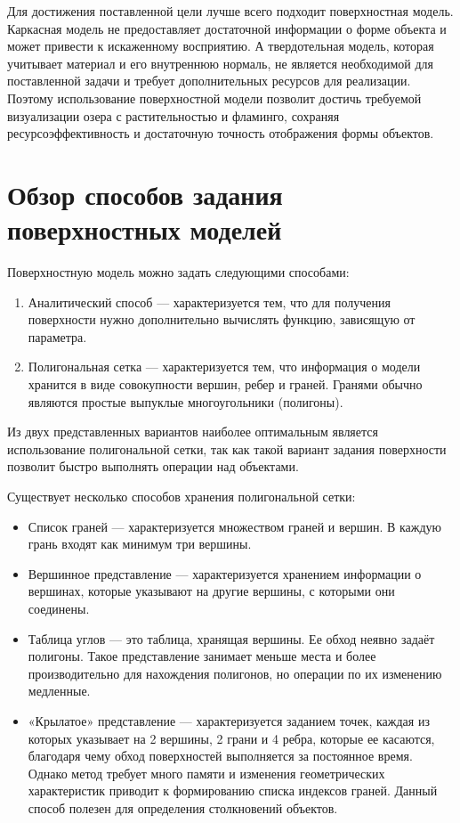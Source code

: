 Для достижения поставленной цели лучше всего подходит поверхностная модель. Каркасная модель не предоставляет достаточной информации о форме объекта и может привести к искаженному восприятию. А твердотельная модель, которая учитывает материал и его внутреннюю нормаль, не является необходимой для поставленной задачи и требует дополнительных ресурсов для реализации. Поэтому использование поверхностной модели позволит достичь требуемой визуализации озера с растительностью и фламинго, сохраняя ресурсоэффективность и достаточную точность отображения формы объектов.

\section{Обзор способов задания поверхностных моделей}

Поверхностную модель можно задать следующими способами:
\begin{enumerate}[label=\arabic*)]
	\item Аналитический способ --- характеризуется тем, что для получения поверхности нужно дополнительно вычислять функцию, зависящую от параметра.
	
	\item Полигональная сетка --- характеризуется тем, что информация о модели хранится в виде совокупности вершин, ребер и граней. Гранями обычно являются простые выпуклые многоугольники (полигоны).
\end{enumerate}

Из двух представленных вариантов наиболее оптимальным является использование полигональной сетки, так как такой вариант задания поверхности позволит быстро выполнять операции над объектами.


Существует несколько способов хранения полигональной сетки:
\begin{itemize}
	\item Список граней --- характеризуется множеством граней и вершин. В каждую грань входят как минимум три вершины. 
	\item Вершинное представление --- характеризуется хранением информации о вершинах, которые указывают на другие вершины, с которыми они соединены.
	\item Таблица углов --- это таблица, хранящая вершины. Ее обход неявно задаёт полигоны. Такое представление занимает меньше места и более производительно для нахождения полигонов, но операции по их изменению медленные.
    \item «Крылатое» представление --- характеризуется заданием точек, каждая из которых указывает на 2 вершины, 2 грани и 4 ребра, которые ее касаются, благодаря чему обход поверхностей выполняется за постоянное время. Однако метод требует много памяти и изменения геометрических характеристик приводит к формированию списка индексов граней. Данный способ полезен для определения столкновений объектов.
\end{itemize}

